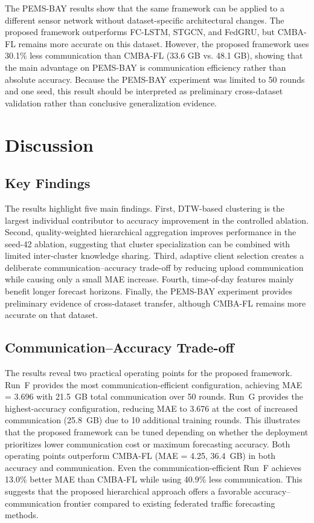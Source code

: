 The PEMS-BAY results show that the same framework can be applied to a different sensor network without dataset-specific architectural changes. The proposed framework outperforms FC-LSTM, STGCN, and FedGRU, but CMBA-FL remains more accurate on this dataset. However, the proposed framework uses 30.1\% less communication than CMBA-FL (33.6 GB vs. 48.1 GB), showing that the main advantage on PEMS-BAY is communication efficiency rather than absolute accuracy. Because the PEMS-BAY experiment was limited to 50 rounds and one seed, this result should be interpreted as preliminary cross-dataset validation rather than conclusive generalization evidence.
\clearpage
\section{Discussion}
\label{sec:discussion}
\subsection{Key Findings}

The results highlight five main findings. First, DTW-based clustering is the largest individual contributor to accuracy improvement in the controlled ablation. Second, quality-weighted hierarchical aggregation improves performance in the seed-42 ablation, suggesting that cluster specialization can be combined with limited inter-cluster knowledge sharing. Third, adaptive client selection creates a deliberate communication--accuracy trade-off by reducing upload communication while causing only a small MAE increase. Fourth, time-of-day features mainly benefit longer forecast horizons. Finally, the PEMS-BAY experiment provides preliminary evidence of cross-dataset transfer, although CMBA-FL remains more accurate on that dataset.

\subsection{Communication--Accuracy Trade-off}
The results reveal two practical operating points for the proposed framework. Run~F provides the most communication-efficient configuration, achieving MAE = 3.696 with 21.5~GB total communication over 50 rounds. Run~G provides the highest-accuracy configuration, reducing MAE to 3.676 at the cost of increased communication (25.8~GB) due to 10 additional training rounds. This illustrates that the proposed framework can be tuned depending on whether the deployment prioritizes lower communication cost or maximum forecasting accuracy.
Both operating points outperform CMBA-FL (MAE = 4.25, 36.4~GB) in both accuracy and communication. Even the communication-efficient Run~F achieves 13.0\% better MAE than CMBA-FL while using 40.9\% less communication. This suggests that the proposed hierarchical approach offers a favorable accuracy--communication frontier compared to existing federated traffic forecasting methods.

